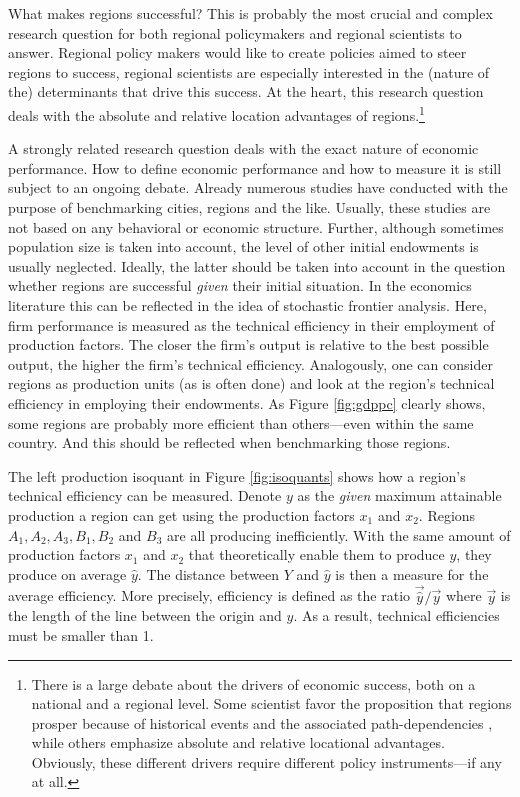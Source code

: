 \documentclass[11pt,parskip,abstracton,notitlepage]{scrartcl}
\begin{document}
What makes regions successful? This is probably the most crucial and complex research question for both regional policymakers and regional scientists to answer. Regional policy makers would like to create policies aimed to steer regions to success, regional scientists are especially interested in the (nature of the) determinants that drive this success. At the heart, this research question deals with the absolute and relative location advantages of regions.\footnote{There is a large debate about the drivers of economic success, both on a national and a regional level. Some scientist favor the proposition that regions prosper because of historical events and the associated path-dependencies \citep[e.g.,][]{LANDES1998}, while others emphasize absolute \citep[e.g.][]{diamond1998guns} and relative \citep[e.g.,][]{FUJITA1999} locational advantages. Obviously, these different drivers require different policy instruments---if any at all.}

A strongly related research question deals with the exact nature of economic performance. How to define economic performance and how to measure it is still subject to an ongoing debate. Already numerous studies have conducted with the purpose of benchmarking cities, regions and the like. Usually, these studies are not based on any behavioral or economic structure. Further, although sometimes population size is taken into account, the level of other initial endowments is usually neglected. Ideally, the latter should be taken into account in the question whether regions are successful \emph{given} their initial situation. In the economics literature this can be reflected in the idea of stochastic frontier analysis. Here, firm performance is measured as the technical efficiency in their employment of production factors. The closer the firm's output is relative to the best possible output, the higher the firm's technical efficiency. Analogously, one can consider regions as production units (as is often done) and look at the region's technical efficiency in employing their endowments. As Figure \ref{fig:gdppc} clearly shows, some regions are probably more efficient than others---even within the same country. And this should be reflected when benchmarking those regions. 

The left production isoquant in Figure \ref{fig:isoquants} shows how a region's technical efficiency can be measured. Denote $y$ as the \emph{given} maximum attainable production a region can get using the production factors $x_1$ and $x_2$. Regions $A_1, A_2, A_3, B_1, B_2$ and $B_3$ are all producing inefficiently. With the same amount of production factors $x_1$ and $x_2$ that theoretically enable them to produce $y$, they produce on average $\hat{y}$. The distance between $Y$ and $\hat{y}$ is then a measure for the average efficiency. More precisely, efficiency is defined as the ratio $\vec{\hat{y}}/\vec{y}$ where  $\vec{y}$ is the length of the line between the origin and $y$. As a result, technical efficiencies must be smaller than 1. 
\end{document}
